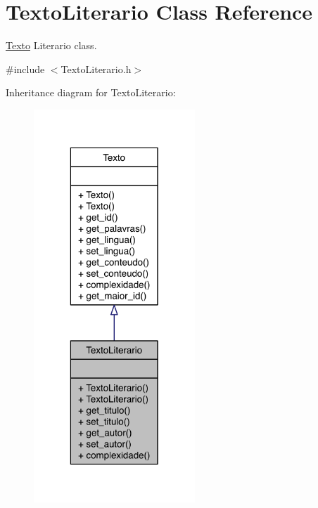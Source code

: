 \hypertarget{class_texto_literario}{\section{Texto\-Literario Class Reference}
\label{class_texto_literario}
}


\hyperlink{class_texto}{Texto} Literario class.  




{\ttfamily \#include $<$Texto\-Literario.\-h$>$}



Inheritance diagram for Texto\-Literario\-:
\nopagebreak
\begin{figure}[H]
\begin{center}
\leavevmode
\includegraphics[width=172pt]{class_texto_literario__inherit__graph}
\end{center}
\end{figure}
